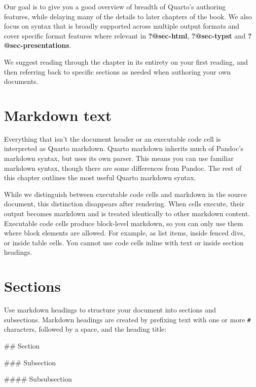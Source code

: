 \documentclass[
  letterpaper,
  DIV=11,
  numbers=noendperiod,
  oneside]{scrreprt}
\newenvironment{Shaded}{\begin{snugshade}}{\end{snugshade}}
\newcommand{\FunctionTok}[1]{\textcolor[rgb]{0.28,0.35,0.67}{#1}}
\begin{document}
\begin{tcolorbox}
Our goal is to give you a good overview of breadth of Quarto's authoring
features, while delaying many of the details to later chapters of the
book. We also focus on syntax that is broadly supported across multiple
output formats and cover specific format features where relevant in
\textbf{?@sec-html}, \textbf{?@sec-typst} and
\textbf{?@sec-presentations}.

We suggest reading through the chapter in its entirety on your first
reading, and then referring back to specific sections as needed when
authoring your own documents.

\section{Markdown text}\label{markdown-text}

Everything that isn't the document header or an executable code cell is
interpreted as Quarto markdown. Quarto markdown inherits much of
Pandoc's markdown syntax, but uses its own parser. This means you can
use familiar markdown syntax, though there are some differences from
Pandoc. The rest of this chapter outlines the most useful Quarto
markdown syntax.

While we distinguish between executable code cells and markdown in the
source document, this distinction disappears after rendering. When cells
execute, their output becomes markdown and is treated identically to
other markdown content. Executable code cells produce block-level
markdown, so you can only use them where block elements are allowed. For
example, as list items, inside fenced divs, or inside table cells. You
cannot use code cells inline with text or inside section headings.

\section{Sections}\label{sections}

Use markdown headings to structure your document into sections and
subsections. Markdown headings are created by prefixing text with one or
more \texttt{\#} characters, followed by a space, and the heading title:

\begin{Shaded}
\begin{Highlighting}[]
\FunctionTok{\#\# Section}

\FunctionTok{\#\#\# Subsection}

\FunctionTok{\#\#\#\# Subsubsection}
\end{Highlighting}
\end{Shaded}


\end{tcolorbox}
\end{document}
